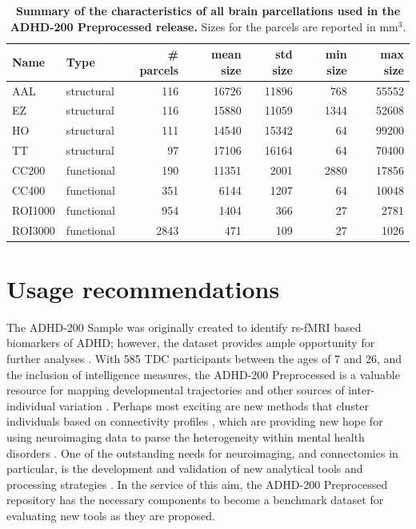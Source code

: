 \documentclass[preprint,12pt,3p]{elsarticle}
\begin{document}
\begin{table}[htbp]
\label{tab_parcellations}
\caption{{\bf Summary of the characteristics of all brain parcellations used in the ADHD-200 Preprocessed release.} Sizes for the parcels are reported in mm$^3$.}
\begin{tabular}{llrrrrr}
Name & Type & \# parcels & mean size & std size & min size & max size \\
\hline
AAL	    & structural &  116 &  16726 & 11896 &  768 & 55552\\
EZ	    & structural &  116 &  15880 & 11059 & 1344 & 52608\\
HO	    & structural &  111 &  14540 & 15342 &   64 & 99200\\
TT	    & structural & 	 97 &  17106 & 16164 &   64 & 70400\\
CC200   & functional &  190 &  11351 &  2001 & 2880 & 17856\\
CC400   & functional &  351 &   6144 &  1207 &   64 & 10048\\
ROI1000 & functional &  954 &   1404 &   366 &   27 & 2781\\
ROI3000	& functional & 2843	&    471 &   109 &   27 & 1026\\
\end{tabular}
\end{table}


\section{Usage recommendations}

The ADHD-200 Sample was originally created to identify rs-fMRI based biomarkers of ADHD; however, the dataset provides ample opportunity for further analyses \cite{craddock2015}. With 585 TDC participants between the ages of 7 and 26, and the inclusion of intelligence measures, the ADHD-200 Preprocessed is a valuable resource for mapping developmental trajectories \cite{dosenbach2010, zuo2010, dimartino2014} and other sources of inter-individual variation \cite{kelly2012}. Perhaps most exciting are new methods that cluster individuals based on connectivity profiles \cite{miranda2014connectotyping, finn2015fingerprinting}, which are providing new hope for using neuroimaging data to parse the heterogeneity within mental health disorders \cite{castellanos2013}. One of the outstanding needs for neuroimaging, and connectomics in particular, is the development and validation of new analytical tools and processing strategies \cite{craddock2013,varoquaux2013,craddock2015}. In the service of this aim, the ADHD-200 Preprocessed repository has the necessary components to become a benchmark dataset for evaluating new tools as they are proposed.
\end{document}
